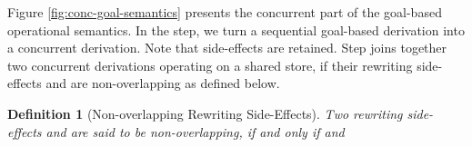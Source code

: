 \documentclass{tlp}
\newtheorem{definition}{Definition}[section]
\begin{document}

Figure \ref{fig:conc-goal-semantics} presents the concurrent part of the goal-based operational 
semantics. In the  step, we turn a sequential goal-based derivation into a 
concurrent derivation. Note that side-effects are retained. Step  joins 
together two concurrent derivations operating on a shared store, if
their rewriting side-effects  and  are 
non-overlapping as defined below.

\begin{definition} [Non-overlapping Rewriting Side-Effects] \label{def:non-overlap-side-effects}
   Two rewriting side-effects  and 
    are said to be non-overlapping,
   if and only if  and 
    
\end{definition}
\end{document}
